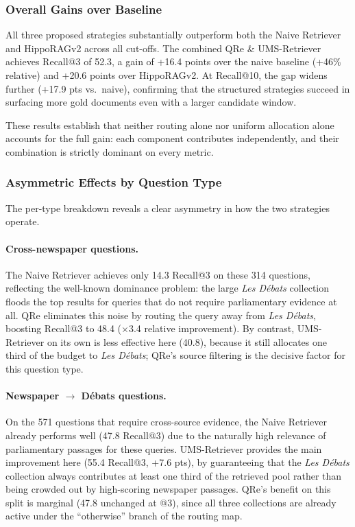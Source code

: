\subsubsection{Overall Gains over Baseline}
\label{sec:results-overall}

All three proposed strategies substantially outperform both the Naive Retriever
and HippoRAGv2 across all cut-offs.
The combined QRe \& UMS-Retriever achieves Recall@3 of 52.3, a gain of +16.4 points over the naive baseline (+46\% relative) and +20.6 points over HippoRAGv2.
At Recall@10, the gap widens further (+17.9 pts vs.\ naive), confirming that
the structured strategies succeed in surfacing more gold documents even with
a larger candidate window.

These results establish that neither routing alone nor uniform allocation alone
accounts for the full gain: each component contributes independently, and their
combination is strictly dominant on every metric.

\subsubsection{Asymmetric Effects by Question Type}
\label{sec:results-asymmetric}

The per-type breakdown reveals a clear asymmetry in how the two strategies operate.

\paragraph{Cross-newspaper questions.}
The Naive Retriever achieves only 14.3 Recall@3 on these 314 questions, reflecting
the well-known dominance problem: the large \textit{Les Débats} collection floods
the top results for queries that do not require parliamentary evidence at all.
QRe eliminates this noise by routing the query away from \textit{Les Débats},
boosting Recall@3 to 48.4 ($\times$3.4 relative improvement).
By contrast, UMS-Retriever on its own is less effective here (40.8), because
it still allocates one third of the budget to \textit{Les Débats};
QRe's source filtering is the decisive factor for this question type.

\paragraph{Newspaper $\rightarrow$ Débats questions.}
On the 571 questions that require cross-source evidence, the Naive Retriever already
performs well (47.8 Recall@3) due to the naturally high relevance of parliamentary
passages for these queries.
UMS-Retriever provides the main improvement here (55.4 Recall@3, +7.6 pts),
by guaranteeing that the \textit{Les Débats} collection always contributes at
least one third of the retrieved pool rather than being crowded out by
high-scoring newspaper passages.
QRe's benefit on this split is marginal (47.8 unchanged at @3), since all three
collections are already active under the ``otherwise'' branch of the routing map.

